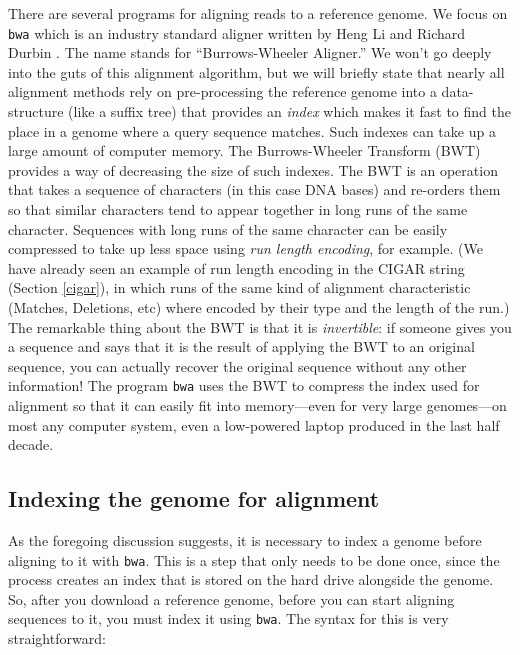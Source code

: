 \documentclass[]{krantz}
\begin{document}
There are several programs for aligning reads to a reference genome. We focus on \texttt{bwa} which is
an industry standard aligner written by Heng Li and Richard Durbin \citep{liFastAccurateShort2009}. The name
stands for ``Burrows-Wheeler Aligner.'' We won't go deeply into the guts of this alignment algorithm, but we
will briefly state that nearly all alignment methods rely on pre-processing the reference genome into a
data-structure (like a suffix tree) that provides an \emph{index} which makes it fast to find the place in
a genome where a query sequence matches. Such indexes can take up a large amount of computer memory.
The Burrows-Wheeler Transform (BWT) provides a way of decreasing the size of such indexes. The BWT is an
operation that takes a sequence of characters (in this case DNA bases) and re-orders them so that similar
characters tend to appear together in long runs of the same character. Sequences with long runs of
the same character can be easily compressed to take up less space using \emph{run length encoding}, for example.
(We have already seen an example of run length encoding in the CIGAR string (Section \ref{cigar}), in which
runs of the same kind of alignment characteristic (Matches, Deletions, etc) where encoded by their type
and the length of the run.) The remarkable thing about the BWT is that it is \emph{invertible}: if someone gives
you a sequence and says that it is the result of applying the BWT to an original sequence, you can
actually recover the original sequence without any other information! The program \texttt{bwa} uses the BWT to
compress the index used for alignment so that it can easily fit into memory---even for very large genomes---on most any computer system, even a low-powered laptop produced in the last half decade.

\hypertarget{indexing-the-genome-for-alignment}{%
\subsection{Indexing the genome for alignment}\label{indexing-the-genome-for-alignment}}

As the foregoing discussion suggests, it is necessary to index a genome before aligning to it
with \texttt{bwa}. This is a step that only needs to be done once, since the process creates an index
that is stored on the hard drive alongside the genome. So, after you download a reference genome,
before you can start aligning sequences to it, you must index it using \texttt{bwa}. The syntax for this
is very straightforward:
\end{document}
